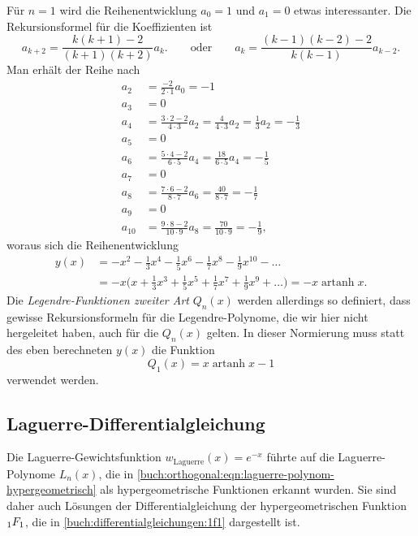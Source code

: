 Für $n=1$ wird die Reihenentwicklung $a_0=1$ und $a_1=0$ etwas
interessanter.
Die Rekursionsformel für die Koeffizienten ist
\[
a_{k+2}
=
\frac{k(k+1)-2}{(k+1)(k+2)} a_k.
\qquad\text{oder}\qquad
a_k
=
\frac{(k-1)(k-2)-2}{k(k-1)}
a_{k-2}.
\]
Man erhält der Reihe nach
\begin{align*}
a_2 &= \frac{-2}{2\cdot 1} a_0 = -1
\\
a_3 &= 0
\\
a_4 &= \frac{3\cdot 2-2}{4\cdot 3} a_2 = \frac{4}{4\cdot 3}a_2 = \frac13a_2 = -\frac13
\\
a_5 &= 0
\\
a_6 &= \frac{5\cdot 4-2}{6\cdot 5}a_4 = \frac{18}{6\cdot 5}a_4 = -\frac15
\\
a_7 &= 0
\\
a_8 &= \frac{7\cdot 6-2}{8\cdot 7}a_6 = \frac{40}{8\cdot 7} = -\frac17
\\
a_9 &= 0
\\
a_{10} &= \frac{9\cdot 8-2}{10\cdot 9}a_8 = \frac{70}{10\cdot 9} = -\frac19,
\end{align*}
woraus sich die Reihenentwicklung
\begin{align*}
y(x)
&=
-x^2 -\frac13x^4 -\frac15x^6 - \frac17x^8 -\frac19x^{10}-\dots
\\
&=
-x\biggl(x+\frac13x^3 + \frac15x^5 + \frac17x^7 + \frac19x^9+\dots\biggr)
=
-x\operatorname{artanh}x.
\end{align*}
Die {\em Legendre-Funktionen zweiter Art} $Q_n(x)$  werden allerdings
so definiert, dass gewisse Rekursionsformeln für die Legendre-Polynome,
die wir hier nicht hergeleitet haben, auch für die $Q_n(x)$ gelten.
In dieser Normierung muss statt des eben berechneten $y(x)$ die Funktion
\[
Q_1(x) = x \operatorname{artanh}x-1
\]
verwendet werden.

%
%
\subsection{Laguerre-Differentialgleichung
\label{buch:orthogonal:subsection:laguerre-differentialgleichung}}
Die Laguerre-Gewichtsfunktion $w_{\text{Laguerre}}(x)=e^{-x}$
%
führte auf die Laguerre-Polynome $L_n(x)$, die in 
\eqref{buch:orthogonal:eqn:laguerre-polynom-hypergeometrisch}
als hypergeometrische Funktionen erkannt wurden.
Sie sind daher auch Lösungen der Differentialgleichung
der hypergeometrischen Funktion $\mathstrut_1F_1$, die in
\eqref{buch:differentialgleichungen:1f1} dargestellt ist.

